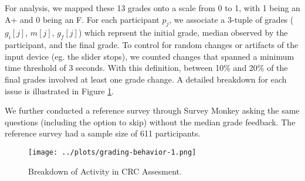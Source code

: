 For analysis, we mapped these 13 grades onto a scale from 0 to 1, with 1 being an A+ and 0 being an F.
For each participant $p_j$, we associate a 3-tuple of grades ($g_i[j]$, $m[j]$, $g_f[j]$) which reprsent the initial grade, median observed by the participant, and the final grade.
To control for random changes or artifacts of the input device (eg. the slider stops), we counted changes
that spanned a minimum time threshold of 3 seconds.
With this definition, between 10\% and 20\% of the final grades involved at least one grade change.
A detailed breakdown for each issue is illustrated in Figure \ref{grading-2}.

We further conducted a reference survey through Survey Monkey asking the same questions (including the option to skip) without the median grade feedback. 
The reference survey had a sample size of 611 participants.

\begin{figure}[h!]
  \centering
    \texttt{[image: ../plots/grading-behavior-1.png]}
      \caption{Breakdown of Activity in CRC Assesment.}
      \label{grading-2}
\end{figure}

